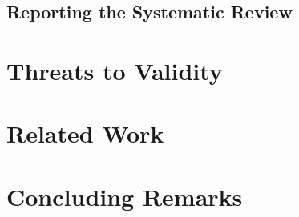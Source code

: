 	\subsection{Reporting the Systematic Review\label{reporting}}
		

		
\section{Threats to Validity}\label{threats}
		
		
\section{Related Work\label{related}}
	
			
\section{Concluding Remarks}\label{conclusion}
		
%	


